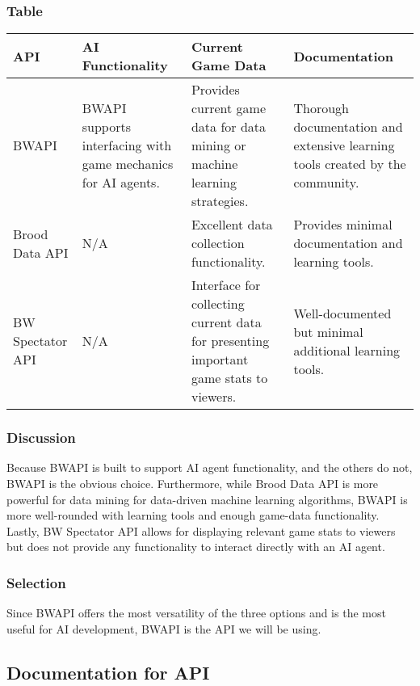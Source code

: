\documentclass[10pt,letterpaper,onecolumn,draftclsnofoot]{IEEEtran}
\begin{document}
\subsubsection{Table}
\begin{center}
	\begin{tabular}{ ||B|M|M|M|| } 
		\hline
		API & AI Functionality & Current Game Data & Documentation \\
		\hline
		BWAPI & BWAPI supports interfacing with game mechanics for AI agents. & Provides current game data for data mining or machine learning strategies. & Thorough documentation and extensive learning tools created by the community. \\ 
		\hline
		Brood Data API & N/A & Excellent data collection functionality. & Provides minimal documentation and learning tools. \\ 
		\hline
		BW Spectator API & N/A  & Interface for collecting current data for presenting important game stats to viewers. & Well-documented but minimal additional learning tools. \\ 
		\hline
	\end{tabular}
\end{center}
\subsubsection{Discussion}
	Because BWAPI is built to support AI agent functionality, and the others do not, BWAPI is the obvious choice. Furthermore, while Brood Data API is more powerful for data mining for data-driven machine learning algorithms, BWAPI is more well-rounded with learning tools and enough game-data functionality. Lastly, BW Spectator API allows for displaying relevant game stats to viewers but does not provide any functionality to interact directly with an AI agent.
\subsubsection{Selection}
	Since BWAPI offers the most versatility of the three options and is the most useful for AI development, BWAPI is the API we will be using. 
\subsection{Documentation for API}
\end{document}
